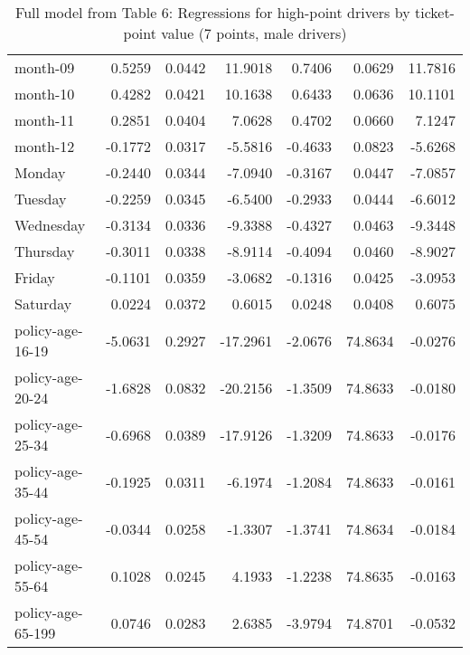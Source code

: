 \documentclass[10pt]{article}
\begin{document}
\begin{table}[ht]
\begin{tabular}{lrrrrrr}
  month-09 & 0.5259 & 0.0442 & 11.9018 & 0.7406 & 0.0629 & 11.7816 \\ 
  month-10 & 0.4282 & 0.0421 & 10.1638 & 0.6433 & 0.0636 & 10.1101 \\ 
  month-11 & 0.2851 & 0.0404 & 7.0628 & 0.4702 & 0.0660 & 7.1247 \\ 
  month-12 & -0.1772 & 0.0317 & -5.5816 & -0.4633 & 0.0823 & -5.6268 \\ 
  Monday & -0.2440 & 0.0344 & -7.0940 & -0.3167 & 0.0447 & -7.0857 \\ 
  Tuesday & -0.2259 & 0.0345 & -6.5400 & -0.2933 & 0.0444 & -6.6012 \\ 
  Wednesday & -0.3134 & 0.0336 & -9.3388 & -0.4327 & 0.0463 & -9.3448 \\ 
  Thursday & -0.3011 & 0.0338 & -8.9114 & -0.4094 & 0.0460 & -8.9027 \\ 
  Friday & -0.1101 & 0.0359 & -3.0682 & -0.1316 & 0.0425 & -3.0953 \\ 
  Saturday & 0.0224 & 0.0372 & 0.6015 & 0.0248 & 0.0408 & 0.6075 \\ 
  policy-age-16-19 & -5.0631 & 0.2927 & -17.2961 & -2.0676 & 74.8634 & -0.0276 \\ 
  policy-age-20-24 & -1.6828 & 0.0832 & -20.2156 & -1.3509 & 74.8633 & -0.0180 \\ 
  policy-age-25-34 & -0.6968 & 0.0389 & -17.9126 & -1.3209 & 74.8633 & -0.0176 \\ 
  policy-age-35-44 & -0.1925 & 0.0311 & -6.1974 & -1.2084 & 74.8633 & -0.0161 \\ 
  policy-age-45-54 & -0.0344 & 0.0258 & -1.3307 & -1.3741 & 74.8634 & -0.0184 \\ 
  policy-age-55-64 & 0.1028 & 0.0245 & 4.1933 & -1.2238 & 74.8635 & -0.0163 \\ 
  policy-age-65-199 & 0.0746 & 0.0283 & 2.6385 & -3.9794 & 74.8701 & -0.0532 \\ 
   \hline
\end{tabular}
\caption{Full model from Table 6: Regressions for high-point drivers by ticket-point value (7 points, male drivers)} 
\label{tab_6_7_pts_M}
\end{table}


\clearpage
\pagebreak



\end{document}
